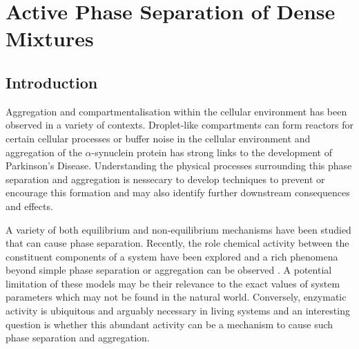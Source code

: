 

\chapter{\label{ch:2-draft}Active Phase Separation of Dense Mixtures}

\minitoc

\section{Introduction}

Aggregation and compartmentalisation within the cellular environment has been observed in a variety of contexts\cite{weber_drops_2021}. Droplet-like compartments can form reactors for certain cellular processes\cite{nott_phase_2015} or buffer noise in the cellular environment\cite{klosin_phase_2020} and aggregation of the $\alpha$-synuclein protein has strong links to the development of Parkinson's Disease\cite{tong_loss_2010}. Understanding the physical processes surrounding this phase separation and aggregation is nessecary to develop techniques to prevent or encourage this formation and may also identify further downstream consequences and effects.

A variety of both equilibrium and non-equilibrium mechanisms have been studied that can cause phase separation\cite{li_non-equilibrium_2020,weber_drops_2021}. Recently, the role chemical activity between the constituent components of a system have been explored and a rich phenomena beyond simple phase separation or aggregation can be observed \cite{agudo-canalejo_active_2019}. A potential limitation of these models may be their relevance to the exact values of system parameters which may not be found in the natural world. Conversely, enzymatic activity is ubiquitous and arguably necessary in living systems and an interesting question is whether this abundant activity can be a mechanism to cause such phase separation and aggregation.

